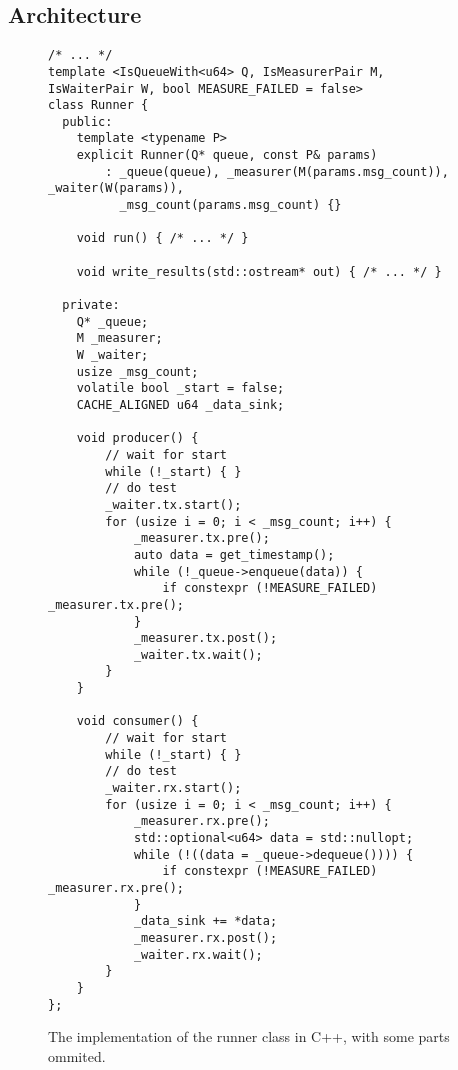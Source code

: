\subsection{Architecture}
\begin{figure}
    \begin{verbatim}
/* ... */
template <IsQueueWith<u64> Q, IsMeasurerPair M, IsWaiterPair W, bool MEASURE_FAILED = false>
class Runner {
  public:
    template <typename P>
    explicit Runner(Q* queue, const P& params)
        : _queue(queue), _measurer(M(params.msg_count)), _waiter(W(params)),
          _msg_count(params.msg_count) {}

    void run() { /* ... */ }

    void write_results(std::ostream* out) { /* ... */ }

  private:
    Q* _queue;
    M _measurer;
    W _waiter;
    usize _msg_count;
    volatile bool _start = false;
    CACHE_ALIGNED u64 _data_sink;

    void producer() {
        // wait for start
        while (!_start) { }
        // do test
        _waiter.tx.start();
        for (usize i = 0; i < _msg_count; i++) {
            _measurer.tx.pre();
            auto data = get_timestamp();
            while (!_queue->enqueue(data)) {
                if constexpr (!MEASURE_FAILED) _measurer.tx.pre();
            }
            _measurer.tx.post();
            _waiter.tx.wait();
        }
    }

    void consumer() {
        // wait for start
        while (!_start) { }
        // do test
        _waiter.rx.start();
        for (usize i = 0; i < _msg_count; i++) {
            _measurer.rx.pre();
            std::optional<u64> data = std::nullopt;
            while (!((data = _queue->dequeue()))) {
                if constexpr (!MEASURE_FAILED) _measurer.rx.pre();
            }
            _data_sink += *data;
            _measurer.rx.post();
            _waiter.rx.wait();
        }
    }
};
    \end{verbatim}
    \caption{The implementation of the runner class in C++, with some parts ommited.}
    \label{fig:runner-class-code}
\end{figure}

